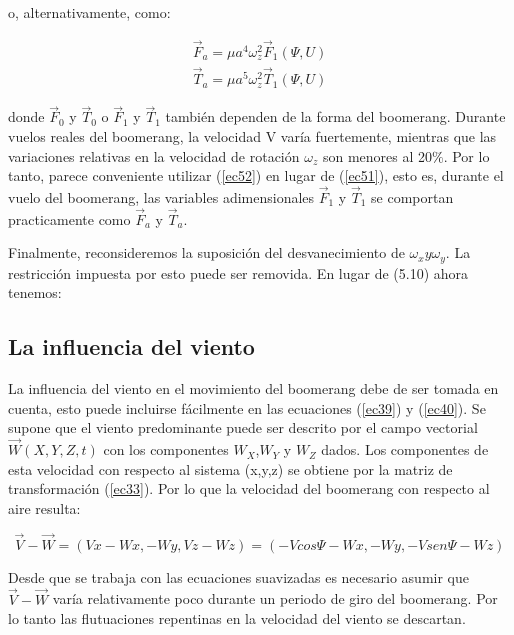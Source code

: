 	o, alternativamente, como:

		\begin{subequations}
    	\begin{align}
		{\vec{F}}_{a}={\mu}{a}^{4}{\omega}_{z}^{2}{\vec{F}}_{1}(\Psi,U)\\
		{\vec{T}}_{a}={\mu}{a}^{5}{\omega}_{z}^{2}{\vec{T}}_{1}(\Psi,U)
		\end{align}
		\label{ec52}
		\end{subequations}

	donde ${\vec{F}}_{0}$ y ${\vec{T}}_{0}$ o ${\vec{F}}_{1}$ y ${\vec{T}}_{1}$ también dependen de la forma del boomerang. Durante vuelos reales del boomerang, la velocidad V varía fuertemente, mientras que las variaciones relativas en la velocidad de rotación ${\omega}_{z}$ son menores al 20$\%$. Por lo tanto, parece conveniente utilizar (\ref{ec52}) en lugar de (\ref{ec51}), esto es, durante el vuelo del boomerang, las variables adimensionales ${\vec{F}}_{1}$ y ${\vec{T}}_{1}$ se comportan practicamente como ${\vec{F}}_{a}$ y ${\vec{T}}_{a}$.

	Finalmente, reconsideremos la suposición del desvanecimiento de ${ \omega }_{ x } y { \omega }_{ y }$. La restricción impuesta por esto puede ser removida. En lugar de (5.10) ahora tenemos:


	\subsection{La influencia del viento}

	La influencia del viento en el movimiento del boomerang debe de ser tomada en cuenta, esto puede incluirse fácilmente en las ecuaciones  (\ref{ec39}) y (\ref{ec40}). Se supone que el viento predominante puede ser descrito por el campo vectorial $\vec{W}(X,Y,Z,t)$  con los componentes $W_{X}$,$W_{Y}$ y $W_{Z}$ dados. Los componentes de esta velocidad con respecto al sistema (x,y,z) se obtiene por la matriz de transformación (\ref{ec33}). Por lo que la velocidad del boomerang con respecto al aire resulta:

		\begin{equation}
		\vec{V} - \vec{W} = ({Vx}-{Wx}, {-Wy}, {Vz}-{Wz}) = (-{V}cos{\Psi}-{Wx}, {-Wy}, -{V}sen{\Psi}-{Wz})
		\label{ec53}
		\end{equation}

	Desde que se trabaja con las ecuaciones suavizadas es necesario asumir que $\vec{V}-\vec{W}$ varía relativamente poco durante un periodo de giro del boomerang. Por lo tanto las flutuaciones repentinas en la velocidad del viento se descartan.


